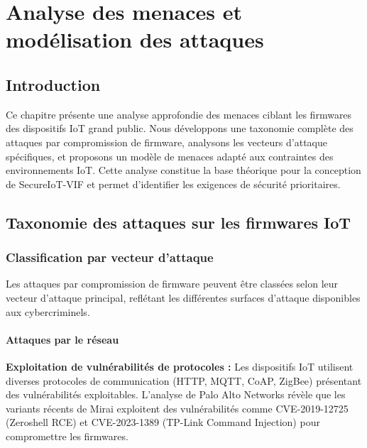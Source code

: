 
\chapter{Analyse des menaces et modélisation des attaques}
\label{chap:threat-analysis}

\section{Introduction}

Ce chapitre présente une analyse approfondie des menaces ciblant les firmwares des dispositifs IoT grand public. Nous développons une taxonomie complète des attaques par compromission de firmware, analysons les vecteurs d'attaque spécifiques, et proposons un modèle de menaces adapté aux contraintes des environnements IoT. Cette analyse constitue la base théorique pour la conception de SecureIoT-VIF et permet d'identifier les exigences de sécurité prioritaires.

\section{Taxonomie des attaques sur les firmwares IoT}

\subsection{Classification par vecteur d'attaque}

Les attaques par compromission de firmware peuvent être classées selon leur vecteur d'attaque principal, reflétant les différentes surfaces d'attaque disponibles aux cybercriminels.

\subsubsection{Attaques par le réseau}

\textbf{Exploitation de vulnérabilités de protocoles :} Les dispositifs IoT utilisent diverses protocoles de communication (HTTP, MQTT, CoAP, ZigBee) présentant des vulnérabilités exploitables. L'analyse de Palo Alto Networks \cite{PaloAlto2023MiraiVariant} révèle que les variants récents de Mirai exploitent des vulnérabilités comme CVE-2019-12725 (Zeroshell RCE) et CVE-2023-1389 (TP-Link Command Injection) pour compromettre les firmwares.

